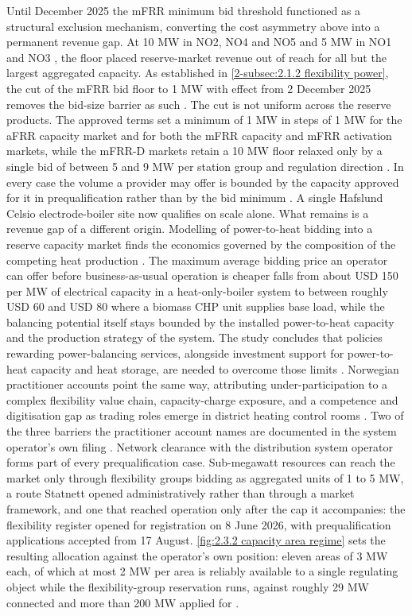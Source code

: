 Until December 2025 the mFRR minimum bid threshold functioned as a structural exclusion mechanism, converting the cost asymmetry above into a permanent revenue gap. At 10 MW in NO2, NO4 and NO5 and 5 MW in NO1 and NO3 \cite{dalen_fleksibilitet_nodate}, the floor placed reserve-market revenue out of reach for all but the largest aggregated capacity. As established in \autoref{2-subsec:2.1.2 flexibility power}, the cut of the mFRR bid floor to 1 MW with effect from 2 December 2025 removes the bid-size barrier as such \cite{statnett_1_2025}. The cut is not uniform across the reserve products. The approved terms set a minimum of 1 MW in steps of 1 MW for the aFRR capacity market and for both the mFRR capacity and mFRR activation markets, while the mFRR-D markets retain a 10 MW floor relaxed only by a single bid of between 5 and 9 MW per station group and regulation direction \cite{statnett_forslag_2025}. In every case the volume a provider may offer is bounded by the capacity approved for it in prequalification rather than by the bid minimum \cite{statnett_forslag_2025}. A single Hafslund Celsio electrode-boiler site now qualifies on scale alone. What remains is a revenue gap of a different origin. Modelling of power-to-heat bidding into a reserve capacity market finds the economics governed by the composition of the competing heat production \cite{monie_power--heat_2022}. The maximum average bidding price an operator can offer before business-as-usual operation is cheaper falls from about USD 150 per MW of electrical capacity in a heat-only-boiler system to between roughly USD 60 and USD 80 where a biomass CHP unit supplies base load, while the balancing potential itself stays bounded by the installed power-to-heat capacity and the production strategy of the system. The study concludes that policies rewarding power-balancing services, alongside investment support for power-to-heat capacity and heat storage, are needed to overcome those limits \cite{monie_power--heat_2022}. Norwegian practitioner accounts point the same way, attributing under-participation to a complex flexibility value chain, capacity-charge exposure, and a competence and digitisation gap as trading roles emerge in district heating control rooms \cite{gronli_hvor_2025}. Two of the three barriers the practitioner account names are documented in the system operator's own filing \cite{statnett_apning_2026, statnett_innforing_2026, statnett_sporsmal_2026}. Network clearance with the distribution system operator forms part of every prequalification case. Sub-megawatt resources can reach the market only through flexibility groups bidding as aggregated units of 1 to 5 MW, a route Statnett opened administratively rather than through a market framework, and one that reached operation only after the cap it accompanies: the flexibility register opened for registration on 8 June 2026, with prequalification applications accepted from 17 August. \autoref{fig:2.3.2 capacity area regime} sets the resulting allocation against the operator's own position: eleven areas of 3 MW each, of which at most 2 MW per area is reliably available to a single regulating object while the flexibility-group reservation runs, against roughly 29 MW connected and more than 200 MW applied for \cite{statnett_innforing_2026, statnett_apning_2026, statnett_sporsmal_2026}.

